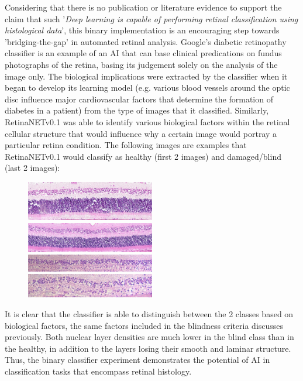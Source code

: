 \documentclass[a4paper]{article}
\begin{document}
    Considering that there is no publication or literature evidence to support the claim that such '\textit{Deep learning is capable of performing retinal classification using histological data}', this binary implementation is an encouraging step towards 'bridging-the-gap' in automated retinal analysis. Google's diabetic retinopathy classifier is an example of an AI that can base clinical predications on fundus photographs of the retina, basing its judgement solely on the analysis of the image only. The biological implications were extracted by the classifier when it began to develop its learning model (e.g. various blood vessels around the optic disc influence major cardiovascular factors that determine the formation of diabetes in a patient) from the type of images that it classified. Similarly, RetinaNETv0.1 was able to identify various biological factors within the retinal cellular structure that would influence why a certain image would portray a particular retina condition. The following images are examples that RetinaNETv0.1 would classify as healthy (first 2 images) and damaged/blind (last 2 images): 
    \begin{figure}[h!]
        \centerline{\includegraphics[width=0.5\textwidth]{../img/binary/normal1.jpg}}
        \centerline{\includegraphics[width=0.5\textwidth]{../img/binary/normal2.jpg}}
        \vspace{3mm}
        \centerline{\includegraphics[width=0.5\textwidth]{../img/binary/blind1.jpg}}
        \centerline{\includegraphics[width=0.5\textwidth]{../img/binary/blind2.jpg}}
    \end{figure}

    \vspace{3mm} 
    It is clear that the classifier is able to distinguish between the 2 classes based on biological factors, the same factors included in the blindness criteria discusses previously. Both nuclear layer densities are much lower in the blind class than in the healthy, in addition to the layers losing their smooth and laminar structure. Thus, the binary classifier experiment demonstrates the potential of AI in classification tasks that encompass retinal histology.
    
\end{document}
